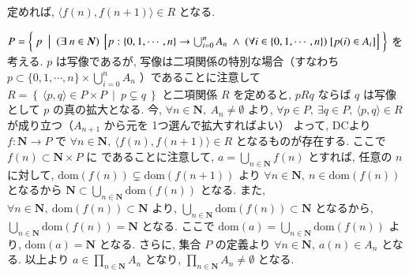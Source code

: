 \begin{nmprob}
{定めれば, $\langle f(n), f(n+1) \rangle \in R$ となる.
\item $P = \biggl\{\ p\ \bigm|\ (\exists\ n \in \bm{N})\ \left[p : \{0, 1, \cdots, n\} \to \bigcup_{i = 0}^n A_n\ \land \ (\forall i \in \{0, 1, \cdots, n\})\ [p(i) \in A_i]\right]\ \biggr\}$
を考える. $p$ は写像であるが, 写像は二項関係の特別な場合（すなわち $p \subset \{0, 1, \cdots, n\} \times \bigcup_{i = 0}^n A_n$ ）であることに注意して
$R = \left\{\ \langle p, q\rangle \in P \times P\ \middle|\ p \subsetneq q\ \right\}$ と二項関係 $R$ を定めると, $pRq$ ならば $q$ は写像として $p$ の真の拡大となる.
今, $\forall n \in \bm{N},\ A_n \neq \emptyset$ より, $\forall p \in P,\ \exists q \in P,\ \langle p, q \rangle \in R$ が成り立つ（$A_{n + 1}$ から元を 1つ選んで拡大すればよい）
よって, DCより $f : \bm{N} \to P$ で $\forall n \in \bm{N},\ \langle f(n), f(n+1) \rangle \in R$ となるものが存在する. ここで $f(n) \subset \bm{N} \times P$ に
であることに注意して, $a = \bigcup_{n \in \bm{N}}f(n)$ とすれば, 任意の $n$ に対して, $\text{dom}(f(n)) \subsetneq \text{dom}(f(n+1))$ より
$\forall n \in \bm{N},\ n \in \text{dom}(f(n))$ となるから $\bm{N} \subset \bigcup_{n \in \bm{N}}\text{dom}(f(n))$ となる. また, $\forall n \in \bm{N},\ \text{dom}(f(n)) \subset \bm{N}$
より, $\bigcup_{n \in \bm{N}}\text{dom}(f(n)) \subset \bm{N}$ となるから, $\bigcup_{n \in \bm{N}}\text{dom}(f(n)) = \bm{N}$ となる. ここで
$\text{dom}(a) = \bigcup_{n \in \bm{N}}\text{dom}(f(n))$ より, $\text{dom}(a) = \bm{N}$ となる.
さらに, 集合 $P$ の定義より $\forall n \in \bm{N},\ a(n) \in A_n$ となる. 以上より $a \in \prod_{n \in \bm{N}}A_n$ となり, $\prod_{n \in \bm{N}}A_n \neq \emptyset$ となる. 
}
\end{nmprob}



